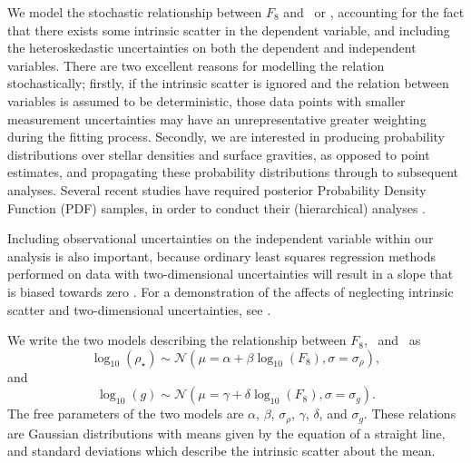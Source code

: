 We model the stochastic relationship between $F_8$ and \logg\ or \rhostar,
accounting for the fact that there exists some intrinsic scatter in
the dependent variable, and including the heteroskedastic uncertainties on both
the dependent and independent variables.
There are two excellent reasons for modelling the relation stochastically;
firstly, if the intrinsic scatter is ignored and the relation between
variables is assumed to be deterministic, those data points with smaller
measurement uncertainties may have an unrepresentative greater weighting
during the fitting process.
Secondly, we are interested in producing probability distributions over stellar
densities and surface gravities, as opposed to point estimates, and propagating
these probability distributions through to subsequent analyses.
Several recent studies have required posterior Probability Density
Function (PDF) samples, in order to conduct their (hierarchical)
analyses \citep[e.g.][]{foreman-mackey:2014, rogers:2015, angus:2015}.

Including observational uncertainties on the independent variable within our
analysis is also important, because ordinary least squares regression methods
performed on data with two-dimensional uncertainties will result in a slope
that is biased towards zero
\citep[e.g.][]{fuller:1987, fox:1997}.
For a demonstration of the affects of neglecting intrinsic scatter and
two-dimensional uncertainties, see \citet{kelly:2007}.

We write the two models describing the relationship between $F_8$, \logg\ and
\rhostar\ as
\begin{equation}
	\log_{10}(\rho_\star) \sim \mathcal{N}(\mu = \alpha + \beta
	\log_{10}(F_8), \sigma = \sigma_{\rho}),
\end{equation}
\label{eq:rho}
and
\begin{equation}
	\log_{10}(g) \sim \mathcal{N}(\mu = \gamma + \delta \log_{10}(F_8),
	\sigma = \sigma_g).
\end{equation}
\label{eq:logg}
The free parameters of the two models are $\alpha$, $\beta$, $\sigma_{\rho}$,
$\gamma$, $\delta$, and $\sigma_g$.
These relations are Gaussian distributions with means
given by the equation of a straight line, and standard deviations which
describe the intrinsic scatter about the mean.

